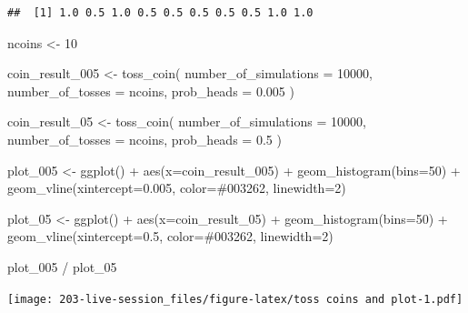 \documentclass[
]{book}
\newenvironment{Shaded}{\begin{snugshade}}{\end{snugshade}}
\newcommand{\AttributeTok}[1]{\textcolor[rgb]{0.77,0.63,0.00}{#1}}
\newcommand{\DecValTok}[1]{\textcolor[rgb]{0.00,0.00,0.81}{#1}}
\newcommand{\FloatTok}[1]{\textcolor[rgb]{0.00,0.00,0.81}{#1}}
\newcommand{\FunctionTok}[1]{\textcolor[rgb]{0.00,0.00,0.00}{#1}}
\newcommand{\NormalTok}[1]{#1}
\newcommand{\OtherTok}[1]{\textcolor[rgb]{0.56,0.35,0.01}{#1}}
\newcommand{\SpecialCharTok}[1]{\textcolor[rgb]{0.00,0.00,0.00}{#1}}
\newcommand{\StringTok}[1]{\textcolor[rgb]{0.31,0.60,0.02}{#1}}
\theoremstyle{definition}
\theoremstyle{definition}
\theoremstyle{definition}
\theoremstyle{definition}
\theoremstyle{remark}
\begin{document}
\begin{verbatim}
##  [1] 1.0 0.5 1.0 0.5 0.5 0.5 0.5 0.5 1.0 1.0
\end{verbatim}

\begin{Shaded}
\begin{Highlighting}[]
\NormalTok{ncoins }\OtherTok{\textless{}{-}} \DecValTok{10}

\NormalTok{coin\_result\_005 }\OtherTok{\textless{}{-}} \FunctionTok{toss\_coin}\NormalTok{(}
  \AttributeTok{number\_of\_simulations =} \DecValTok{10000}\NormalTok{,}
  \AttributeTok{number\_of\_tosses =}\NormalTok{ ncoins, }
  \AttributeTok{prob\_heads =} \FloatTok{0.005}
\NormalTok{  )}

\NormalTok{coin\_result\_05 }\OtherTok{\textless{}{-}} \FunctionTok{toss\_coin}\NormalTok{(}
  \AttributeTok{number\_of\_simulations =} \DecValTok{10000}\NormalTok{,}
  \AttributeTok{number\_of\_tosses =}\NormalTok{ ncoins, }
  \AttributeTok{prob\_heads =} \FloatTok{0.5}
\NormalTok{  )}

\NormalTok{plot\_005 }\OtherTok{\textless{}{-}} \FunctionTok{ggplot}\NormalTok{() }\SpecialCharTok{+} 
    \FunctionTok{aes}\NormalTok{(}\AttributeTok{x=}\NormalTok{coin\_result\_005) }\SpecialCharTok{+} 
    \FunctionTok{geom\_histogram}\NormalTok{(}\AttributeTok{bins=}\DecValTok{50}\NormalTok{) }\SpecialCharTok{+} 
    \FunctionTok{geom\_vline}\NormalTok{(}\AttributeTok{xintercept=}\FloatTok{0.005}\NormalTok{, }\AttributeTok{color=}\StringTok{\textquotesingle{}\#003262\textquotesingle{}}\NormalTok{, }\AttributeTok{linewidth=}\DecValTok{2}\NormalTok{)}

\NormalTok{plot\_05 }\OtherTok{\textless{}{-}} \FunctionTok{ggplot}\NormalTok{() }\SpecialCharTok{+} 
    \FunctionTok{aes}\NormalTok{(}\AttributeTok{x=}\NormalTok{coin\_result\_05) }\SpecialCharTok{+} 
    \FunctionTok{geom\_histogram}\NormalTok{(}\AttributeTok{bins=}\DecValTok{50}\NormalTok{) }\SpecialCharTok{+} 
    \FunctionTok{geom\_vline}\NormalTok{(}\AttributeTok{xintercept=}\FloatTok{0.5}\NormalTok{, }\AttributeTok{color=}\StringTok{\textquotesingle{}\#003262\textquotesingle{}}\NormalTok{, }\AttributeTok{linewidth=}\DecValTok{2}\NormalTok{)}

\NormalTok{plot\_005 }\SpecialCharTok{/} 
\NormalTok{  plot\_05}
\end{Highlighting}
\end{Shaded}

\texttt{[image: 203-live-session\_files/figure-latex/toss coins and plot-1.pdf]}
\end{document}
